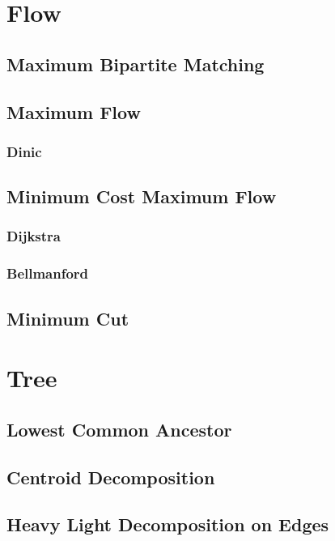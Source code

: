 \documentclass[10pt,a4paper]{report}
\begin{document}
	\section{Flow}
		\subsection{Maximum Bipartite Matching}
			
		\subsection{Maximum Flow}
			\subsubsection{Dinic}
				
		\subsection{Minimum Cost Maximum Flow}
			\subsubsection{Dijkstra}
				
			\subsubsection{Bellmanford}
		\subsection{Minimum Cut}
		
	\section{Tree}
		\subsection{Lowest Common Ancestor}
		\subsection{Centroid Decomposition}
			
		\subsection{Heavy Light Decomposition on Edges}
			
\end{document}
